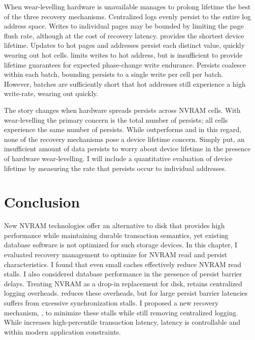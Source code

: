 When wear-levelling hardware is unavailable \NVDisk manages to prolong lifetime the best of the three recovery mechanisms.
Centralized logs evenly persist to the entire log address space.
Writes to individual pages may be bounded by limiting the page flush rate, although at the cost of recovery latency.
\InPlace provides the shortest device lifetime.
Updates to hot pages and addresses persist each distinct value, quickly wearing out hot cells.
\GroupCommit limits writes to hot address, but is insufficient to provide lifetime guarantees for expected phase-change write endurance.
Persists coalesce within each batch, bounding persists to a single write per cell per batch.
However, batches are sufficiently short that hot addresses still experience a high write-rate, wearing out quickly.

The story changes when hardware spreads persists across NVRAM cells.
With wear-levelling the primary concern is the total number of persists; all cells experience the same number of persists.
While \GroupCommit outperforms \NVDisk and \InPlace in this regard, none of the recovery mechanisms pose a device lifetime concern.
Simply put, an insufficient amount of data persists to worry about device lifetime in the presence of hardware wear-levelling.
I will include a quantitative evaluation of device lifetime by measuring the rate that persists occur to individual addresses.




\section{Conclusion}
\label{sec:OLTP_eval:Conclusion}
New NVRAM technologies offer an alternative to disk that provides high performance while maintaining durable transaction semantics, yet existing database software is not optimized for such storage devices.
In this chapter, I evaluated recovery management to optimize for NVRAM read and persist characteristics.
I found that even small caches effectively reduce NVRAM read stalls.
I also considered database performance in the presence of persist barrier delays.
Treating NVRAM as a drop-in replacement for disk, \NVDisk retains centralized logging overheads.
\InPlace reduces these overheads, but for large persist barrier latencies suffers from excessive synchronization stalls.
I proposed a new recovery mechanism, \GroupCommit, to minimize these stalls while still removing centralized logging.
While \GroupCommit increases high-percentile transaction latency, latency is controllable and within modern application constraints.
